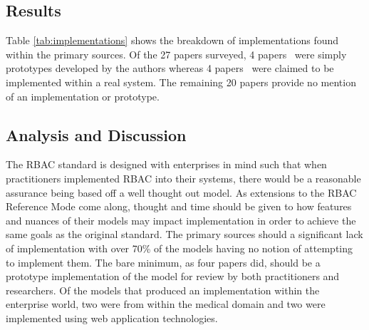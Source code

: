 \subsection{Results}

Table \ref{tab:implementations} shows the breakdown of implementations found within the primary sources.
Of the 27 papers surveyed, 4 papers~\cite{zhou2007team,bao08:role, cholewka00:acontext-sensitive,huang06:pervasive} were simply prototypes developed by the authors whereas 4 papers~\cite{jian2008extended, aich09:role, yao2008task, motta03:contextual} were claimed to be implemented within a real
system. The remaining 20 papers provide no
mention of an implementation or prototype.  

\subsection{Analysis and Discussion}

The RBAC standard is designed with enterprises in mind such that when practitioners implemented RBAC into their systems,
there would be a reasonable assurance being based off a well thought out model.  As extensions to the RBAC Reference Mode
come along, thought and time should be given to how features and nuances of their models may impact implementation
in order to achieve the same goals as the original standard.  The primary sources should a significant lack of implementation
with over 70\% of the models having no notion of attempting to implement them.  The bare minimum, as four papers did, should be
a prototype implementation of the model for review by both practitioners and researchers. Of the models that produced an 
implementation within the enterprise world, two were from within the medical domain and two were implemented using web application technologies.  


